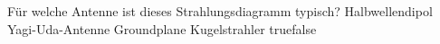     {Für welche Antenne ist dieses Strahlungsdiagramm typisch?}
    {Halbwellendipol}
    {Yagi-Uda-Antenne}
    {Groundplane}
    {Kugelstrahler}
    {true}{false}